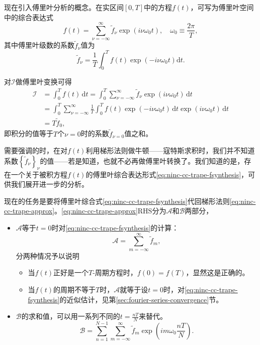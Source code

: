 现在引入傅里叶分析的概念。在实区间$[0,T]$中的方程$f(t)$，可写为傅里叶空间中的综合表达式
\begin{equation}
  \label{eq:ninc-cc-trape-fsynthesis}
  f(t) = \sum_{\nu = - \infty}^{\infty} \tilde{f}_{\nu} \exp \left( i \nu \omega_{0} t \right), \quad \omega_{0} \equiv \frac{2 \pi}{T},
\end{equation}
其中傅里叶级数的系数$\tilde{f}_{\nu}$值为
\begin{equation}
  \label{eq:ninc-cc-trape-fsynthesis-coef}
  \tilde{f}_{\nu} = \frac{1}{T} \int_{0}^{T} f(t) \exp \left( - i \nu \omega_{0} t \right) \mathrm{d} t.
\end{equation}

对$\mathcal{I}$做傅里叶变换可得
\begin{equation*}
  \begin{split}
    \mathcal{I} & = \int_{0}^{T} f(t) \, \mathrm{d} t = \int_{0}^{T} \sum_{\nu = -\infty}^{\infty} \tilde{f}_{\nu} \exp \left( i \nu \omega_{0} t \right) \, \mathrm{d} t \\
    & = \int_{0}^{T} \sum_{\nu = -\infty}^{\infty}
    \frac{1}{T} \int_{0}^{T} f(t) \exp \left( - i \nu \omega_{0} t \right) \, \mathrm{d} t \exp \left( i \nu \omega_{0} t \right) \, \mathrm{d} t \\
    & = T \tilde{f}_{0},
  \end{split}
\end{equation*}
即积分的值等于$T$个$\nu=0$时的系数$\tilde{f}_{\nu = 0}$值之和。

需要强调的时，在对$f(t)$利用梯形法则做牛顿——寇特斯求积时，我们并不知道系数$\left\{ \tilde{f}_{\nu} \right\}_{\nu}$的值——若是知道，也就不必再做傅里叶转换了。我们知道的是，存在一个关于被积方程$f(t)$的傅里叶综合表达形式\eqref{eq:ninc-cc-trape-fsynthesis}，可供我们展开进一步的分析。

现在的任务是要将傅里叶综合式\eqref{eq:ninc-cc-trape-fsynthesis}代回梯形法则\eqref{eq:ninc-cc-trape-approx}。\eqref{eq:ninc-cc-trape-approx}RHS分为$\mathcal{A}$和$\mathcal{B}$两部分，
\begin{itemize}
  \item $\mathcal{A}$等于$t=0$时对\eqref{eq:ninc-cc-trape-fsynthesis}的计算：
  \begin{equation*}
    \mathcal{A} = \sum_{m=-\infty}^{\infty} \tilde{f}_{m},
  \end{equation*}
  分两种情况予以说明
  \begin{itemize}
    \item 当$f(t)$正好是一个$T$-周期方程时，$f(0)=f(T)$，显然这是正确的。
    \item 当$f(t)$的周期不等于$T$时，$\mathcal{A}$就等于设$t=0$时，对\eqref{eq:ninc-cc-trape-fsynthesis}的近似估计，见第\ref{sec:fourier-series-convergence}节。
  \end{itemize}
  \item $\mathcal{B}$的求和值，可以用一系列不同的$t=\frac{n T}{N}$来替代。
  \begin{equation*}
    \mathcal{B} = \sum_{n=1}^{N-1} \sum_{m=-\infty}^{\infty} \tilde{f}_{m} \exp \left( i m \omega_{0} \frac{n T}{N} \right).
  \end{equation*}
\end{itemize}

